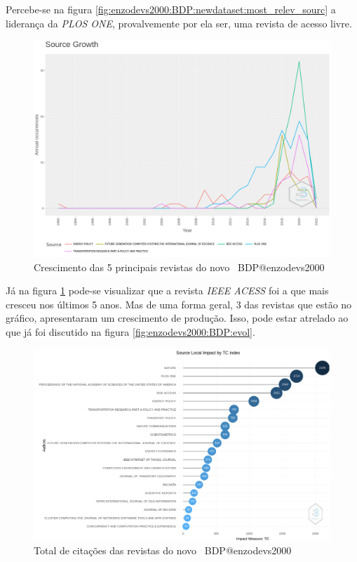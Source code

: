 Percebe-se na figura \ref{fig:enzodevs2000:BDP:newdataset:most_relev_sourc} a liderança da \textit{PLOS ONE}, provalvemente por ela ser, uma revista de acesso livre.

\begin{figure}[H]
    \centering
    \includegraphics[width=1\textwidth]{experiments/enzodevs2000/AnaliseBibliometrica/BigDataInPolicy/Figures/Graficos/NovoDataset/Sources/sourceGrowth.png}
    \caption{Crescimento das 5 principais revistas do novo \dataset\ BDP@enzodevs2000}
    \label{fig:enzodevs2000:BDP:newdataset:source_growth}
\end{figure}

Já na figura \ref{fig:enzodevs2000:BDP:newdataset:source_growth} pode-se visualizar que a revista \textit{IEEE ACESS} foi a que mais cresceu nos últimos 5 anos. Mas de uma forma geral, 3 das revistas que estão no gráfico, apresentaram um crescimento de produção. Isso, pode estar atrelado ao que já foi discutido na figura \ref{fig:enzodevs2000:BDP:evol}.

\begin{figure}[H]
    \centering
    \includegraphics[width=1\textwidth]{experiments/enzodevs2000/AnaliseBibliometrica/BigDataInPolicy/Figures/Graficos/NovoDataset/Sources/totalCitations.png}
    \caption{Total de citações das revistas do novo 
    \dataset\ BDP@enzodevs2000}
    \label{fig:enzodevs2000:BDP:newdataset:total_citations}
\end{figure}

